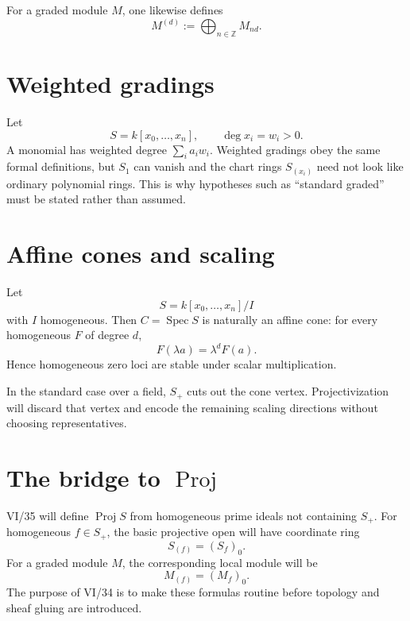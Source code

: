 For a graded module \(M\), one likewise defines
\[
M^{(d)}:=\bigoplus_{n\in\mathbb Z}M_{nd}.
\]



\section{Weighted gradings}
Let
\[
S=k[x_0,\ldots,x_n],\qquad \deg x_i=w_i>0.
\]
A monomial has weighted degree \(\sum_i a_iw_i\). Weighted gradings obey the same formal definitions, but \(S_1\) can vanish and the chart rings \(S_{(x_i)}\) need not look like ordinary polynomial rings. This is why hypotheses such as ``standard graded'' must be stated rather than assumed.

\section{Affine cones and scaling}
Let
\[
S=k[x_0,\ldots,x_n]/I
\]
with \(I\) homogeneous. Then \(C=\operatorname{Spec}S\) is naturally an affine cone: for every homogeneous \(F\) of degree \(d\),
\[
F(\lambda a)=\lambda^dF(a).
\]
Hence homogeneous zero loci are stable under scalar multiplication.

In the standard case over a field, \(S_+\) cuts out the cone vertex. Projectivization will discard that vertex and encode the remaining scaling directions without choosing representatives.



\section{The bridge to \texorpdfstring{\(\operatorname{Proj}\)}{Proj}}
VI/35 will define \(\operatorname{Proj}S\) from homogeneous prime ideals not containing \(S_+\). For homogeneous \(f\in S_+\), the basic projective open will have coordinate ring
\[
\boxed{S_{(f)}=(S_f)_0.}
\]
For a graded module \(M\), the corresponding local module will be
\[
\boxed{M_{(f)}=(M_f)_0.}
\]
The purpose of VI/34 is to make these formulas routine before topology and sheaf gluing are introduced.

